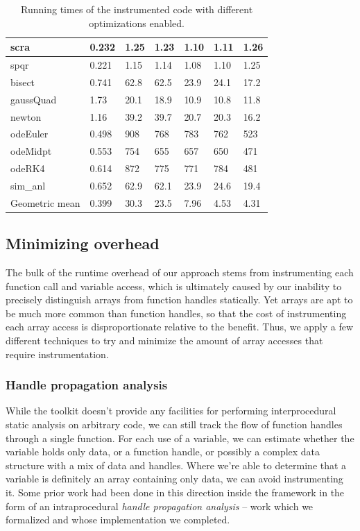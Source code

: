 \begin{table}
\begin{tabular}{| l || l || l | l | l | l | l |}
  scra        & 0.232 & 1.25 & 1.23 & 1.10 & 1.11 & 1.26  \\ \hline
  spqr        & 0.221 & 1.15 & 1.14 & 1.08 & 1.10 & 1.25  \\ \hline
  bisect      & 0.741 & 62.8 & 62.5 & 23.9 & 24.1 & 17.2  \\ \hline
  gaussQuad   & 1.73  & 20.1 & 18.9 & 10.9 & 10.8 & 11.8  \\ \hline
  newton      & 1.16  & 39.2 & 39.7 & 20.7 & 20.3 & 16.2  \\ \hline
  odeEuler    & 0.498 & 908  & 768  & 783  & 762  & 523   \\ \hline
  odeMidpt    & 0.553 & 754  & 655  & 657  & 650  & 471   \\ \hline
  odeRK4      & 0.614 & 872  & 775  & 771  & 784  & 481   \\ \hline
  sim\_anl    & 0.652 & 62.9 & 62.1 & 23.9 & 24.6 & 19.4  \\ \hhline{|=||=||=|=|=|=|=|}
  Geometric mean & 0.399 & 30.3 & 23.5 & 7.96 & 4.53 & 4.31 \\ \hline
\end{tabular}
\caption{Running times of the instrumented code with different optimizations
enabled.}
\label{tab:InstrumentationResults}
\end{table}

\subsection{Minimizing overhead}

The bulk of the runtime overhead of our approach stems from instrumenting each
function call and variable access, which is ultimately caused by our inability
to precisely distinguish arrays from function handles statically. Yet arrays
are apt to be much more common than function handles, so that the cost of
instrumenting each array access is disproportionate relative to the benefit.
Thus, we apply a few different techniques to try and minimize the amount of
array accesses that require instrumentation.

\subsubsection{Handle propagation analysis}

While the \mclab toolkit doesn't provide any facilities for performing
interprocedural static analysis on arbitrary \matlab code, we can still track
the flow of function handles through a single function. For each use of a
variable, we can estimate whether the variable holds only data, or a function
handle, or possibly a complex data structure with a mix of data and handles.
Where we're able to determine that a variable is definitely an array containing
only data, we can avoid instrumenting it. Some prior work had been done in this
direction inside the \mclab framework in the form of an intraprocedural
\emph{handle propagation analysis} -- work which we formalized and whose
implementation we completed.

